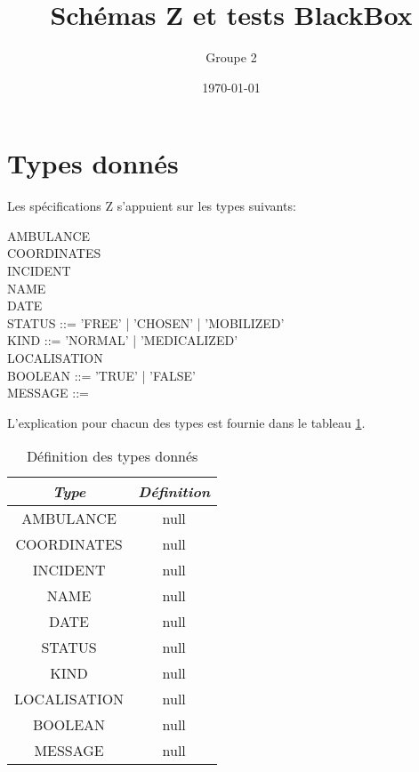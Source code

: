 \documentclass[12pt]{article}
\begin{document}
\title{Schémas Z et tests BlackBox}
\author{Groupe 2}
\date{\today}
\maketitle


\section{Types donnés}
Les spécifications Z s'appuient sur les types suivants:
\begin{zed}
AMBULANCE \\
COORDINATES \\
INCIDENT \\
NAME \\
DATE \\
STATUS ::= 'FREE' | 'CHOSEN' | 'MOBILIZED' \\
KIND ::= 'NORMAL' | 'MEDICALIZED' \\
LOCALISATION \\
BOOLEAN ::= 'TRUE'  | 'FALSE' \\
MESSAGE ::= \\
\end{zed}

L'explication pour chacun des types est fournie dans le tableau \ref{tab:typedefinition}.
\begin{table}[htdp]
\begin{center}\begin{tabular}{|c|c|}\hline 
\textit{Type} & \textit{Définition} \\\hline
AMBULANCE & null \\\hline COORDINATES & null \\\hline INCIDENT & null \\\hline NAME & null \\\hline DATE & null \\\hline STATUS & null \\\hline KIND & null \\\hline LOCALISATION & null \\\hline BOOLEAN & null \\\hline MESSAGE & null \\\hline \end{tabular} \caption{Définition des types donnés}
\end{center}
\label{tab:typedefinition}
\end{table}
\end{document}
